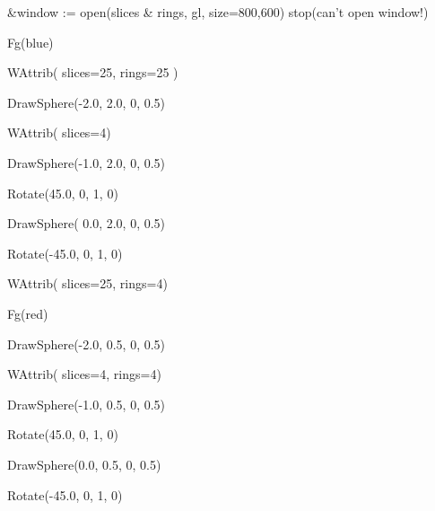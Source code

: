 \documentclass[letterpaper]{article}
\begin{document}
{\sffamily
\ \ \ \&window := open({\textquotedbl}slices \& rings{\textquotedbl}, {\textquotedbl}gl{\textquotedbl},
{\textquotedbl}size=800,600{\textquotedbl}) {\textbar} stop({\textquotedbl}can't open window!{\textquotedbl})}


\bigskip

{\sffamily
\ \ \ Fg({\textquotedbl}blue{\textquotedbl}) \ \ }

{\sffamily
\ \ \ WAttrib( {\textquotedbl}slices=25{\textquotedbl}, {\textquotedbl}rings=25{\textquotedbl} ) \ \ \ \ }

{\sffamily
\ \ \ DrawSphere(-2.0, 2.0, 0, 0.5)}


\bigskip

{\sffamily
\ \ \ WAttrib( {\textquotedbl}slices=4{\textquotedbl}) \ \ \ \ \ }

{\sffamily
\ \ \ DrawSphere(-1.0, 2.0, 0, 0.5)}


\bigskip

{\sffamily
\ \ \ Rotate(45.0, 0, 1, 0)}

{\sffamily
\ \ \ DrawSphere( 0.0, 2.0, 0, 0.5)}

{\sffamily
\ \ \ Rotate(-45.0, 0, 1, 0)}


\bigskip

{\sffamily
\ \ \ WAttrib( {\textquotedbl}slices=25{\textquotedbl}, {\textquotedbl}rings=4{\textquotedbl}) \ \ \ \ \ }

{\sffamily
\ \ \ Fg({\textquotedbl}red{\textquotedbl}) \ \ }

{\sffamily
\ \ \ DrawSphere(-2.0, 0.5, 0, 0.5)}


\bigskip

{\sffamily
\ \ \ WAttrib( {\textquotedbl}slices=4{\textquotedbl}, {\textquotedbl}rings=4{\textquotedbl}) \ \ \ \ \ }

{\sffamily
\ \ \ DrawSphere(-1.0, 0.5, 0, 0.5)}


\bigskip

{\sffamily
\ \ \ Rotate(45.0, 0, 1, 0)}

{\sffamily
\ \ \ DrawSphere(0.0, 0.5, 0, 0.5)}

{\sffamily
\ \ \ Rotate(-45.0, 0, 1, 0)}
\end{document}
